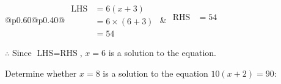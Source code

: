 \documentclass[12pt]{article}
\newcounter{minipagecount}
\begin{document}
\begin{multicols}{2}
\begin{minipage}[t]{0.40\textwidth}
    \renewcommand{\arraystretch}{1.3} %
    \begin{tabular}{@{}p{0.60\linewidth}@{}p{0.40\linewidth}@{}}
        \(\begin{aligned}
            \text{LHS} &= 6(x + 3) \\
                    &= 6 \times(6 + 3) \\
                    &= 54
        \end{aligned}\) &
        \(\begin{aligned}
            \text{RHS} &= 54\\
                    & \\
                    &
        \end{aligned}\)
    \end{tabular}
    \renewcommand{\arraystretch}{1.0} %
    \vspace{2pt}  %

    \noindent \(\therefore\) Since \(\text{LHS} = \text{RHS}\), \(x = 6\) is  a solution to the equation.

\end{minipage}

 \vspace*{16pt}
\noindent{(\theminipagecount)}\hspace{0.1mm} %
\begin{minipage}[t]{0.40\textwidth} %

    \noindent Determine whether \(x = 8\) is a solution to the equation \(10(x + 2) = 90\):
    \vspace{4pt}  %

    \noindent


\end{minipage}
\end{multicols}
\end{document}
